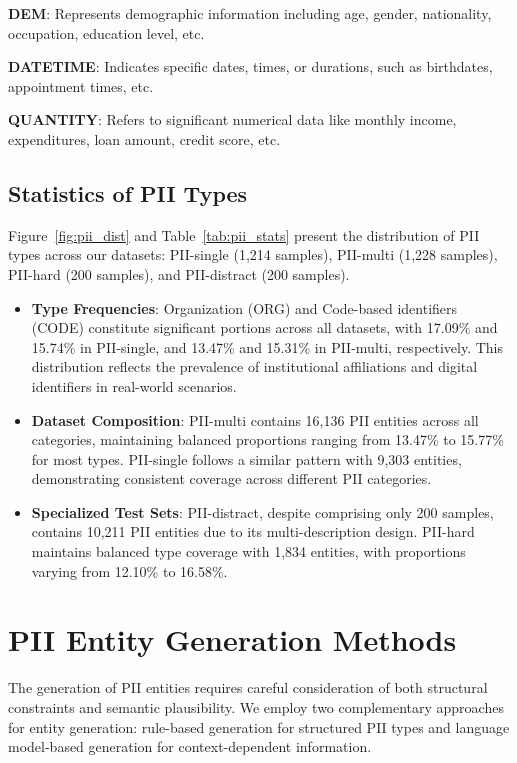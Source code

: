 \textbf{DEM}: Represents demographic information including age, gender, nationality, occupation, education level, etc.

\textbf{DATETIME}: Indicates specific dates, times, or durations, such as birthdates, appointment times, etc.

\textbf{QUANTITY}: Refers to significant numerical data like monthly income, expenditures, loan amount, credit score, etc.

\subsection{Statistics of PII Types}
Figure~\ref{fig:pii_dist} and Table~\ref{tab:pii_stats} present the distribution of PII types across our datasets: PII-single (1,214 samples), PII-multi (1,228 samples), PII-hard (200 samples), and PII-distract (200 samples). 

\begin{itemize}
\item \textbf{Type Frequencies}: Organization (ORG) and Code-based identifiers (CODE) constitute significant portions across all datasets, with 17.09\% and 15.74\% in PII-single, and 13.47\% and 15.31\% in PII-multi, respectively. This distribution reflects the prevalence of institutional affiliations and digital identifiers in real-world scenarios.

\item \textbf{Dataset Composition}: PII-multi contains 16,136 PII entities across all categories, maintaining balanced proportions ranging from 13.47\% to 15.77\% for most types. PII-single follows a similar pattern with 9,303 entities, demonstrating consistent coverage across different PII categories.

\item \textbf{Specialized Test Sets}: PII-distract, despite comprising only 200 samples, contains 10,211 PII entities due to its multi-description design. PII-hard maintains balanced type coverage with 1,834 entities, with proportions varying from 12.10\% to 16.58\%.
\end{itemize}


\section{PII Entity Generation Methods}
\label{sec:ent_gen}
The generation of PII entities requires careful consideration of both structural constraints and semantic plausibility. We employ two complementary approaches for entity generation: rule-based generation for structured PII types and language model-based generation for context-dependent information.
